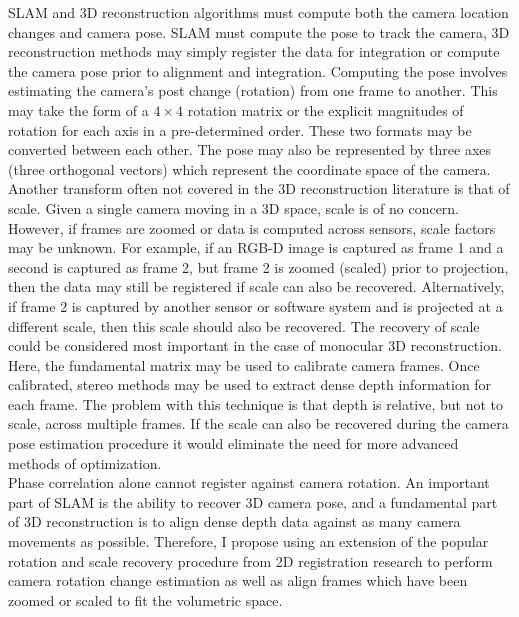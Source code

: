 SLAM and 3D reconstruction algorithms must compute both the camera location changes and camera pose. SLAM must compute the pose to track the camera, 3D reconstruction methods may simply register the data for integration or compute the camera pose prior to alignment and integration. Computing the pose involves estimating the camera's post change (rotation) from one frame to another. This may take the form of a $4 \times 4$ rotation matrix or the explicit magnitudes of rotation for each axis in a pre-determined order. These two formats may be converted between each other. The pose may also be represented by three axes (three orthogonal vectors) which represent the coordinate space of the camera. \\

Another transform often not covered in the 3D reconstruction literature is that of scale. Given a single camera moving in a 3D space, scale is of no concern. However, if frames are zoomed or data is computed across sensors, scale factors may be unknown. For example, if an RGB-D image is captured as frame 1 and a second is captured as frame 2, but frame 2 is zoomed (scaled) prior to projection, then the data may still be registered if scale can also be recovered. Alternatively, if frame 2 is captured by another sensor or software system and is projected at a different scale, then this scale should also be recovered. The recovery of scale could be considered most important in the case of monocular 3D reconstruction. Here, the fundamental matrix may be used to calibrate camera frames. Once calibrated, stereo methods may be used to extract dense depth information for each frame. The problem with this technique is that depth is relative, but not to scale, across multiple frames. If the scale can also be recovered during the camera pose estimation procedure it would eliminate the need for more advanced methods of optimization. \\ 

Phase correlation alone cannot register against camera rotation. An important part of SLAM is the ability to recover 3D camera pose, and a fundamental part of 3D reconstruction is to align dense depth data against as many camera movements as possible. Therefore, I propose using an extension of the popular rotation and scale recovery procedure from 2D registration research to perform camera rotation change estimation as well as align frames which have been zoomed or scaled to fit the volumetric space. \\

